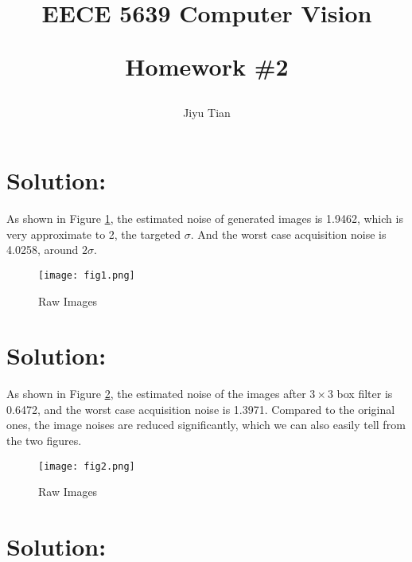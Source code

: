 \documentclass[12pt]{article}
\title{EECE 5639 Computer Vision\\ [2ex] \begin{large} Homework \#2 \end{large} }
\author{Jiyu Tian}
\date{}
\begin{document}
\maketitle
\section{Solution:}
As shown in Figure \ref{raw}, the estimated noise of generated images is 1.9462, which is very approximate to 2, the targeted $\sigma$. And the worst case acquisition noise is 4.0258, around $2\sigma$.
\begin{figure}[H]
\centering
\texttt{[image: fig1.png]}
\caption{Raw Images}
\label{raw}
\end{figure}
\section{Solution:}
As shown in Figure \ref{filtered}, the estimated noise of the images after $3\times3$ box filter is 0.6472, and the worst case acquisition noise is 1.3971. Compared to the original ones, the image noises are reduced significantly, which we can also easily tell from the two figures.
\begin{figure}[H]
\centering
\texttt{[image: fig2.png]}
\caption{Raw Images}
\label{filtered}
\end{figure}
\section{Solution:}
\vfill
\clearpage
\end{document}
